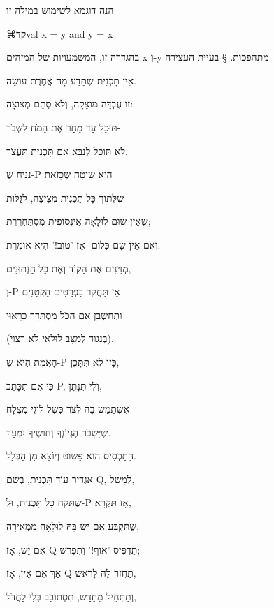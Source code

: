 {הנה דוגמא לשימוש במילה זו
\begin{center}
⌘קד{val x = y and y = x}
\end{center}

בהגדרה זו, המשמעויות של המזהים x וְ-y מתהפכות.
§ בעיית העצירה

\leavevmode
\newline
אֵין תָּכְנִית שֶתֵּדַע מָה אֲחֶרֶת עוֹשָׂה.

זוֹ עֻבְדָּה מוּצָקָה, וְלֹא סְתָם מְצוּצָה:

תּוּכָל עַד מָחָר אֶת הַמֹּח לִשְבֹּר-

לֹא תּוּכַל לְנַבֵּא אִם תָּכְנִית תַּעֲצֹר.
\leavevmode
\newline


נַנִּיחַ שֶ-P הִיא שִיטָה שֶכָּזֹאת

שֶלְּתוֹך כָּל תָּכְנִית מְצִיצָה, לְגַּלּוֹת

שֶאֵין שוּם לוּלָאָה אֵינְסוֹפִית מִסְתַּחְרֶרֶת;

וְאִם אֵין שָם כְּלוּם- אָז 'טוֹב!' הִיא אוֹמֶרֶת.
\leavevmode
\newline


מְזִינִים אֶת הַקּוֹד וְאֶת כָּל הַנְּתוּנִים,

וְ-P אָז תַּחֲקֹר בַּפְּרָטִים הַקְּטַנִּים

וּתְחַשְבֵּן אִם הַכֹּל מִסְתַּדֵּר כָּרָאוּי

(בְּנִגּוּד לְמַצָּב לוּלָאִי לֹא רָצוּי).
\leavevmode
\newline


הָאֱמֶת הִיא שֶ-P כָּזוֹ לֹא תִּתָּכֵן,

כִּי אִם תִּכָּתֵב P, וְלִי תִּנָּתֵן,

אֶשְתַּמֵּש בָּהּ לִצֹּר כֶּשֶל לוֹגִי מֻצְלָח

שֶיִּשְבֹּר הֶגְיוֹנְךָ וְחוּשֶיךָ יִמְעַךְ.
\leavevmode
\newline


הַתַּכְסִיס הוּא פָּשוּט וְיוֹצֵא מִן הַכְּלָל.

אַגְדִּיר עוֹד תָּכְנִית, בְּשֵם Q, לְמָשָל,

שֶתִּקַּח כָּל תָּכְנִית, וּלְ-P אָז תִּקְרָא,

שֶתִּקְבַּע אִם יֵש בָּהּ לוּלָאָה מַמְאִירָה;
\leavevmode
\newline


אִם יֵש, אָז Q תַּדְפִּיס 'אוּף!' וְתִפְרֹש;

אַךְ אִם אֵין, אָז Q תַּחֲזֹר לָהּ לָרֹאש,

וְתַתְחִיל מֵחָדָש, תִּסְתּוֹבֵב בְּלִי לַחֲדֹל,

}
